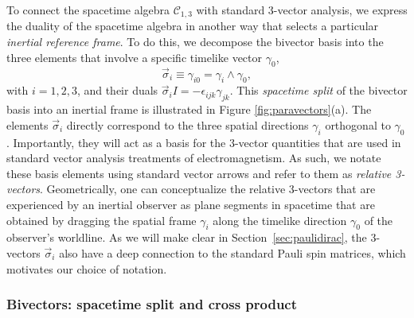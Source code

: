 \documentclass[1p,sort&compress]{elsarticle}
\numberwithin{equation}{section}
\newcommand{\rv}[1]{\vec{#1}}
\begin{document}
To connect the spacetime algebra $\mathcal{C}_{1,3}$ with standard 3-vector analysis, we express the duality of the spacetime algebra in another way that selects a particular \emph{inertial reference frame}.  To do this, we decompose the bivector basis into the three elements that involve a specific timelike vector $\gamma_0$,
\begin{equation}\label{eq:relativebasis}
  \rv{\sigma}_i \equiv \gamma_{i0} = \gamma_i\wedge\gamma_0, 
\end{equation}
with $i=1,2,3$, and their duals $\rv{\sigma}_i I = -\epsilon_{ijk}\gamma_{jk}$.  This \emph{spacetime split} of the bivector basis into an inertial frame is illustrated in Figure \ref{fig:paravectors}(a).  The elements $\rv{\sigma}_i$ directly correspond to the three spatial directions $\gamma_i$ orthogonal to $\gamma_0$.  Importantly, they will act as a basis for the 3-vector quantities that are used in standard vector analysis treatments of electromagnetism.  As such, we notate these basis elements using standard vector arrows and refer to them as \emph{relative 3-vectors}.  Geometrically, one can conceptualize the relative 3-vectors that are experienced by an inertial observer as plane segments in spacetime that are obtained by dragging the spatial frame $\gamma_i$ along the timelike direction $\gamma_0$ of the observer's worldline.  As we will make clear in Section~\ref{sec:paulidirac}, the 3-vectors $\rv{\sigma}_i$ also have a deep connection to the standard Pauli spin matrices, which motivates our choice of notation.


\subsubsection{Bivectors: spacetime split and cross product}\label{sec:bivectorsplit}

\end{document}
